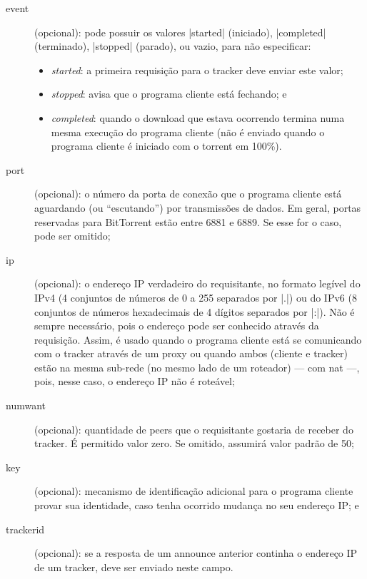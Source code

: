 \begin{description}
    \item[event] (opcional): pode possuir os valores \sverb|started| (iniciado),
        \sverb|completed| (terminado), \sverb|stopped| (parado), ou vazio, para não
        especificar:

        \begin{itemize}
            \item \emph{started}: a primeira requisição para o \gls*{tracker} deve
                enviar este valor;
            \item \emph{stopped}: avisa que o programa cliente está fechando; e
            \item \emph{completed}: quando o download que estava ocorrendo termina numa
                mesma execução do programa cliente (não é enviado quando o programa
                cliente é iniciado com o \gls*{torrent} em 100\%).
        \end{itemize}

    \item[port] (opcional): o número da porta de conexão que o programa cliente está
        aguardando (ou ``escutando'') por transmissões de dados. Em geral, portas
        reservadas para BitTorrent estão entre 6881 e 6889. Se esse for o caso, pode
        ser omitido;

    \item[ip] (opcional): o endereço IP verdadeiro do requisitante, no formato legível
        do IPv4 (4 conjuntos de números de 0 a 255 separados por \bverb|.|) ou do IPv6
        (8 conjuntos de números hexadecimais de 4 dígitos separados por \bverb|:|). Não
        é sempre necessário, pois o endereço pode ser conhecido através da requisição.
        Assim, é usado quando o programa cliente está se comunicando com o
        \gls*{tracker} através de um \gls{proxy} ou quando ambos (cliente e
        \gls*{tracker}) estão na mesma sub-rede (no mesmo lado de um roteador) ---
        com \gls{nat} ---, pois, nesse caso, o endereço IP não é roteável;

    \item[numwant] (opcional): quantidade de \glspl*{peer} que o requisitante gostaria
        de receber do \gls*{tracker}. É permitido valor zero. Se omitido, assumirá
        valor padrão de 50;

    \item[key] (opcional): mecanismo de identificação adicional para o programa cliente
        provar sua identidade, caso tenha ocorrido mudança no seu endereço IP; e

    \item[trackerid] (opcional): se a resposta de um \gls*{announce} anterior continha
        o endereço IP de um \gls*{tracker}, deve ser enviado neste campo.
\end{description}


